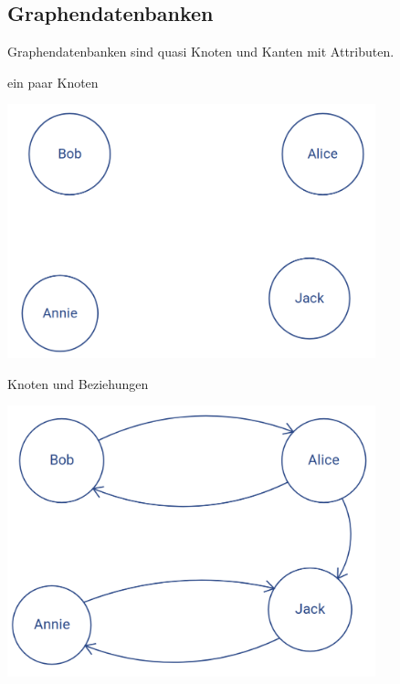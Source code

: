 \subsection*{Graphendatenbanken}

\begin{frame}{}
  Graphendatenbanken sind quasi Knoten und Kanten mit Attributen.
\end{frame}

\begin{frame}{ein paar Knoten}
  \begin{center}
    \includegraphics[width=0.8\textwidth]{pics/knoten}
  \end{center}
\end{frame}

\begin{frame}{Knoten und Beziehungen}
  \begin{center}
    \includegraphics[width=0.8\textwidth]{pics/knoten-beziehungen}
  \end{center}
\end{frame}

